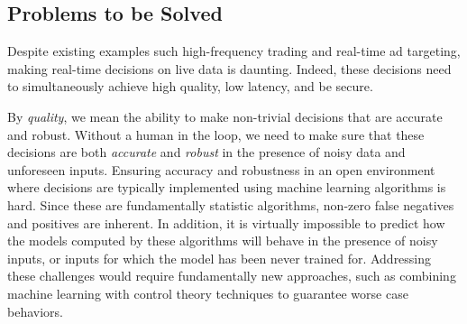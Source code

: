 \documentclass [10pt]{article}
\begin{document}
\begin{outline}



\subsection{Problems to be Solved}

Despite existing examples such high-frequency trading and real-time ad targeting, making real-time decisions on live data is daunting. Indeed, these decisions need to simultaneously achieve high quality, low latency, and be secure. 

By {\em quality}, we mean the ability to make non-trivial decisions that are accurate and robust. Without a human in the loop, we need to make sure that these decisions are both {\em accurate} and {\em robust} in the presence of noisy data and unforeseen inputs. Ensuring accuracy and robustness in an open environment where decisions are typically implemented using machine learning algorithms is hard. Since these are fundamentally statistic algorithms, non-zero false negatives and positives are inherent. In addition,  it is virtually impossible to predict how the models computed by these  algorithms will behave in the presence of noisy inputs, or inputs for which the model has been never trained for. Addressing these challenges would require fundamentally new approaches, such as combining machine learning with control theory techniques to guarantee worse case behaviors.


\end{outline}
\end{document}
